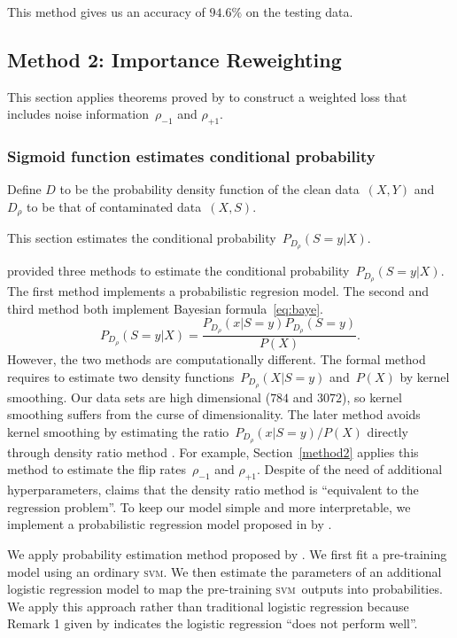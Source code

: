 \documentclass[12pt]{article} %
\newcommand{\svm}{\textsc{svm}}
\newcommand{\rhoo}{\rho_{+1}}
\newcommand{\rhoz}{\rho_{-1}}
\begin{document}
This method gives us an accuracy of $94.6\%$ on the testing data.


\subsection{Method 2: Importance Reweighting} \label{3rd}
This section applies theorems proved by \citet{liu2016classification} to construct a weighted loss that includes noise information~$\rhoz$ and $\rhoo$.

\subsubsection{Sigmoid function estimates conditional probability}\label{sigmoid}
Define $D$ to be the probability density function of the clean data~$(X,Y)$ and $D_\rho$ to be that of contaminated data~$(X,S)$.

This section estimates the conditional probability~$P_{D_\rho}(S=y|X)$.

\citet{liu2016classification} provided three methods to estimate the conditional probability~$P_{D_\rho}(S=y|X)$.
The first method implements a probabilistic regresion model.
The second and third method both implement Bayesian formula~\eqref{eq:baye}.
\begin{equation*}
   P_{D_\rho}(S=y|X)=\frac{P_{D_\rho}(x|S=y)P_{D_\rho}(S=y)}{P(X)}.
\end{equation*}
However, the two methods are computationally different. The formal method requires to estimate two density functions~$P_{D_\rho}(X|S=y)$ and~$P(X)$ by kernel smoothing. Our data sets are high dimensional ($784$ and $3072$), so kernel smoothing suffers from the curse of dimensionality. The later method avoids kernel smoothing by estimating the ratio~$P_{D_\rho}(x|S=y)/P(X)$ directly through density ratio method \citep{liu2016classification}. For example, Section~\ref{method2} applies this method to estimate the flip rates~$\rhoz$ and $\rhoo$. Despite of the need of additional hyperparameters,  \citet{Sugiyama10densityratio} claims that the density ratio method is ``equivalent to the regression problem''. To keep our model simple and more interpretable, we implement a probabilistic regression model proposed in by \citet[Section~5.1]{liu2016classification}.

We apply probability estimation method proposed by \citet{Platt99probabilisticoutputs}. We first fit a pre-training model using an ordinary \svm . We then estimate the parameters of an additional logistic regression model to map the pre-training \svm\ outputs into probabilities. We apply this approach rather than traditional logistic regression because Remark 1 given by \citet{liu2016classification} indicates the logistic regression ``does not perform well''.
\end{document}
